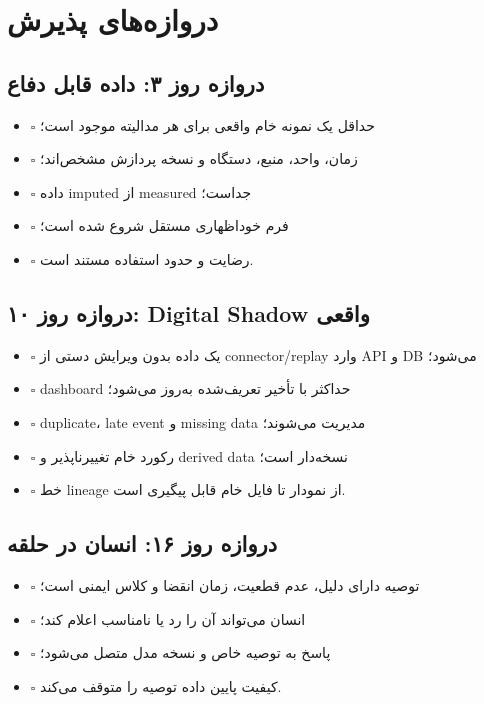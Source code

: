 \documentclass[11pt,a4paper]{article}
\newcommand{\checkmarkbox}{\(\square\)}
\begin{document}
\section{دروازه‌های پذیرش}

\subsection{دروازه روز ۳: داده قابل دفاع}
\begin{itemize}
  \item \checkmarkbox{} حداقل یک نمونه خام واقعی برای هر مدالیته موجود است؛
  \item \checkmarkbox{} زمان، واحد، منبع، دستگاه و نسخه پردازش مشخص‌اند؛
  \item \checkmarkbox{} داده imputed از measured جداست؛
  \item \checkmarkbox{} فرم خوداظهاری مستقل شروع شده است؛
  \item \checkmarkbox{} رضایت و حدود استفاده مستند است.
\end{itemize}

\subsection{دروازه روز ۱۰: Digital Shadow واقعی}
\begin{itemize}
  \item \checkmarkbox{} یک داده بدون ویرایش دستی از connector/replay وارد API و DB می‌شود؛
  \item \checkmarkbox{} dashboard حداکثر با تأخیر تعریف‌شده به‌روز می‌شود؛
  \item \checkmarkbox{} duplicate، late event و missing data مدیریت می‌شوند؛
  \item \checkmarkbox{} رکورد خام تغییرناپذیر و derived data نسخه‌دار است؛
  \item \checkmarkbox{} خط lineage از نمودار تا فایل خام قابل پیگیری است.
\end{itemize}

\subsection{دروازه روز ۱۶: انسان در حلقه}
\begin{itemize}
  \item \checkmarkbox{} توصیه دارای دلیل، عدم قطعیت، زمان انقضا و کلاس ایمنی است؛
  \item \checkmarkbox{} انسان می‌تواند آن را رد یا نامناسب اعلام کند؛
  \item \checkmarkbox{} پاسخ به توصیه خاص و نسخه مدل متصل می‌شود؛
  \item \checkmarkbox{} کیفیت پایین داده توصیه را متوقف می‌کند.
\end{itemize}
\end{document}

